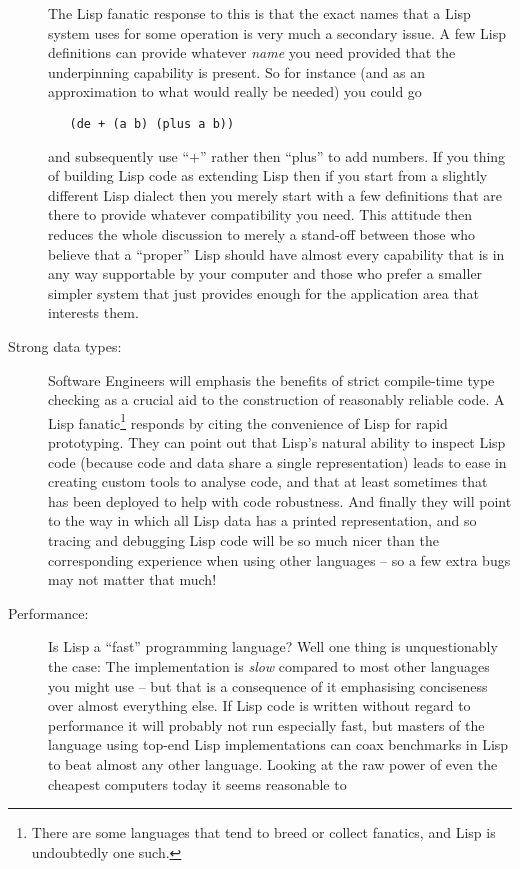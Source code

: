 \begin{description}
The Lisp fanatic response to this is that the exact names that a Lisp system
uses for some operation is very much a secondary issue. A few Lisp
definitions can provide whatever {\em name} you need provided that the
underpinning capability is present. So for instance (and as an approximation
to what would really be needed) you could go
{\small\begin{verbatim}
   (de + (a b) (plus a b))
\end{verbatim}}
\noindent and subsequently use ``{\tx +}'' rather then ``{\tx plus}'' to
add numbers. If you thing of building Lisp code as extending Lisp then
if you start from a slightly different Lisp dialect then you merely
start with a few definitions that are there to provide whatever compatibility
you need. This attitude then reduces the whole discussion to merely a stand-off
between those who believe that a ``proper'' Lisp should have almost every
capability that is in any way supportable by your computer and those who
prefer a smaller simpler system that just provides enough for the application
area that interests them.
\item[Strong data types:] Software Engineers will emphasis the benefits of
strict compile-time type checking as a crucial aid to the construction of
reasonably reliable code. A Lisp fanatic\footnote{There are some languages
that tend to breed or collect fanatics, and Lisp is undoubtedly one such.}
responds by citing the convenience of Lisp for rapid prototyping. They can
point out that Lisp's natural ability to inspect Lisp code (because code and
data share a single representation) leads to ease in creating custom tools to
analyse code, and that at least sometimes that has been deployed to help
with code robustness. And finally they will point to the way in which
all Lisp data has a printed representation, and so tracing and debugging
Lisp code will be so much nicer than the corresponding experience when
using other languages -- so a few extra bugs may not matter that much!
\item[Performance:] Is Lisp a ``fast'' programming language? Well one thing
is unquestionably the case: The \vsl implementation is {\em slow} compared
to most other languages you might use -- but that is a consequence of it
emphasising conciseness over almost everything else. If Lisp code is written
without regard to performance it will probably not run especially fast,
but masters of the language using top-end Lisp implementations can coax
benchmarks in Lisp to beat almost any other language. Looking at the
raw power of even the cheapest computers today it seems reasonable to

\end{description}
